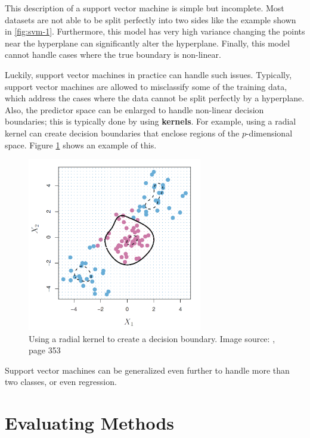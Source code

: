 \documentclass{article}
\begin{document}
This description of a support vector machine is simple but incomplete. Most datasets are not able to be split perfectly into two sides like the example shown in \ref{fig:svm-1}. Furthermore, this model has very high variance changing the points near the hyperplane can significantly alter the hyperplane. Finally, this model cannot handle cases where the true boundary is non-linear.

Luckily, support vector machines in practice can handle such issues. Typically, support vector machines are allowed to misclassify some of the training data, which address the cases where the data cannot be split perfectly by a hyperplane. Also, the predictor space can be enlarged to handle non-linear decision boundaries; this is typically done by using \textbf{kernels}. For example, using a radial kernel can create decision boundaries that enclose regions of the $p$-dimensional space. Figure \ref{fig:svm-2} shows an example of this.

\begin{figure}[!h]
	\centering
	\caption{Using a radial kernel to create a decision boundary. Image source: \cite{james2013introduction}, page 353}
	\label{fig:svm-2}
	\includegraphics[width = 3in]{images/svm-2}
\end{figure}

Support vector machines can be generalized even further to handle more than two classes, or even regression.
\section{Evaluating Methods}
\end{document}
